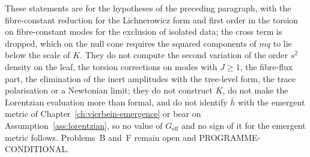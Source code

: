 These statements are for the hypotheses of the preceding paragraph, with the fibre-constant reduction for the Lichnerowicz form and first order in the torsion on fibre-constant modes for the exclusion of isolated data; the cross term is dropped, which on the null cone requires the squared components of \(mq\) to lie below the scale of \(K\). They do not compute the second variation of the order \(s^2\) density on the leaf, the torsion corrections on modes with \(J\ge1\), the fibre-flux part, the elimination of the inert amplitudes with the tree-level form, the trace polarisation or a Newtonian limit; they do not construct \(K\), do not make the Lorentzian evaluation more than formal, and do not identify \(\bar h\) with the emergent metric of Chapter~\ref{ch:vierbein-emergence} or bear on Assumption~\ref{ass:lorentzian}, so no value of \(G_{\mathrm{eff}}\) and no sign of it for the emergent metric follows. Problems~B and~F remain open and PROGRAMME-CONDITIONAL.
